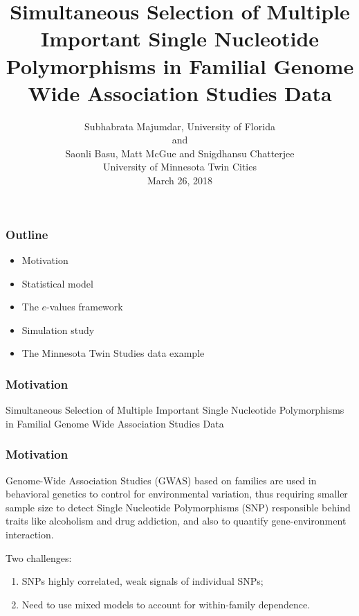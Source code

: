 \documentclass[handout,10pt]{beamer}
\title[Simultaneous Selection of Multiple SNPs]
{
Simultaneous Selection of Multiple Important Single Nucleotide Polymorphisms in Familial Genome Wide Association Studies Data}
\author[Majumdar {\it et al}]{Subhabrata Majumdar, University of Florida\\
and\\
Saonli Basu, Matt McGue and Snigdhansu Chatterjee\\
University of Minnesota Twin Cities\\
\vspace{1em}
March 26, 2018}
\date [March 26, 2018]
\begin{document}

\frame{ \titlepage}


\begin{frame}
\frametitle{Outline}
\begin{itemize}
\item Motivation

\item Statistical model

\item The $e$-values framework

\item Simulation study

\item The Minnesota Twin Studies data example
\end{itemize}
\end{frame}


\begin{frame}
\frametitle{Motivation}

\centering
{\large
{\colrbf Simultaneous} Selection of Multiple Important Single Nucleotide Polymorphisms in {\colrbf Familial} Genome Wide Association Studies Data
}
\end{frame}

\begin{frame}
\frametitle{Motivation}

\vspace{1em}
Genome-Wide Association Studies (GWAS) based on families are used in behavioral genetics to control for environmental variation, thus requiring smaller sample size to detect Single Nucleotide Polymorphisms (SNP) responsible behind traits like alcoholism and drug addiction, and also to quantify gene-environment interaction.

\vspace{1em}
Two challenges:

\begin{enumerate}
\item SNPs highly correlated, weak signals of individual SNPs;

\item Need to use mixed models to account for within-family dependence.
\end{enumerate}

\end{frame}
\end{document}
